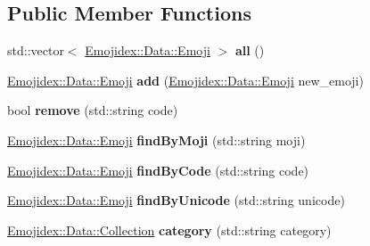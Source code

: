 \subsection*{Public Member Functions}
\begin{DoxyCompactItemize}
\item 
std\+::vector$<$ \hyperlink{classEmojidex_1_1Data_1_1Emoji}{Emojidex\+::\+Data\+::\+Emoji} $>$ {\bfseries all} ()\hypertarget{classEmojidex_1_1Data_1_1Collection_a650a418293d89311263dc3e744416b1f}{}\label{classEmojidex_1_1Data_1_1Collection_a650a418293d89311263dc3e744416b1f}

\item 
\hyperlink{classEmojidex_1_1Data_1_1Emoji}{Emojidex\+::\+Data\+::\+Emoji} {\bfseries add} (\hyperlink{classEmojidex_1_1Data_1_1Emoji}{Emojidex\+::\+Data\+::\+Emoji} new\+\_\+emoji)\hypertarget{classEmojidex_1_1Data_1_1Collection_ab06d56b5d177f1e489d36c5ccf02b362}{}\label{classEmojidex_1_1Data_1_1Collection_ab06d56b5d177f1e489d36c5ccf02b362}

\item 
bool {\bfseries remove} (std\+::string code)\hypertarget{classEmojidex_1_1Data_1_1Collection_a1e149fc6e461293a80babfd7461b02f4}{}\label{classEmojidex_1_1Data_1_1Collection_a1e149fc6e461293a80babfd7461b02f4}

\item 
\hyperlink{classEmojidex_1_1Data_1_1Emoji}{Emojidex\+::\+Data\+::\+Emoji} {\bfseries find\+By\+Moji} (std\+::string moji)\hypertarget{classEmojidex_1_1Data_1_1Collection_a85b15d61175aee9cce9b42fe6c21cf80}{}\label{classEmojidex_1_1Data_1_1Collection_a85b15d61175aee9cce9b42fe6c21cf80}

\item 
\hyperlink{classEmojidex_1_1Data_1_1Emoji}{Emojidex\+::\+Data\+::\+Emoji} {\bfseries find\+By\+Code} (std\+::string code)\hypertarget{classEmojidex_1_1Data_1_1Collection_a5ba6be5a862e6e23b2a5c99e6d751615}{}\label{classEmojidex_1_1Data_1_1Collection_a5ba6be5a862e6e23b2a5c99e6d751615}

\item 
\hyperlink{classEmojidex_1_1Data_1_1Emoji}{Emojidex\+::\+Data\+::\+Emoji} {\bfseries find\+By\+Unicode} (std\+::string unicode)\hypertarget{classEmojidex_1_1Data_1_1Collection_a54f948efec77f14099defd7e6172a5b0}{}\label{classEmojidex_1_1Data_1_1Collection_a54f948efec77f14099defd7e6172a5b0}

\item 
\hyperlink{classEmojidex_1_1Data_1_1Collection}{Emojidex\+::\+Data\+::\+Collection} {\bfseries category} (std\+::string category)\hypertarget{classEmojidex_1_1Data_1_1Collection_a230c9aae3e864b28cc25b94d861246bb}{}\label{classEmojidex_1_1Data_1_1Collection_a230c9aae3e864b28cc25b94d861246bb}


\end{DoxyCompactItemize}
